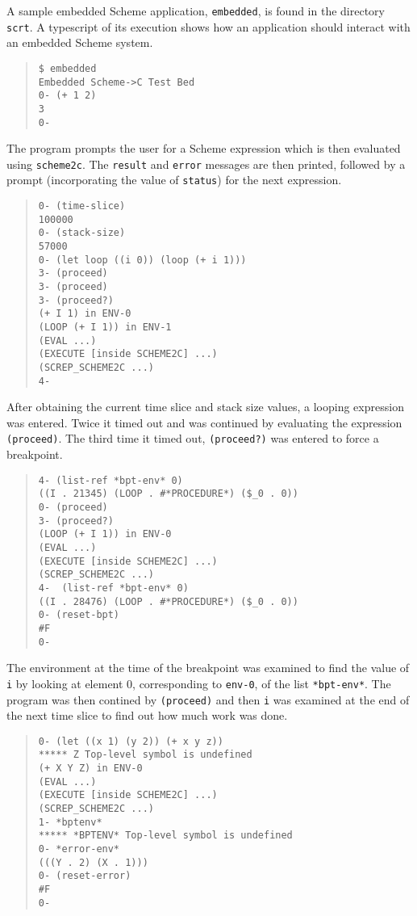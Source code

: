 \documentclass[12pt]{article}
\begin{document}
A sample embedded Scheme application, \texttt{embedded}, is found in
the directory \texttt{scrt}.  A typescript of its execution shows
how an application should interact with an embedded Scheme system.
\begin{quote}
\begin{verbatim}
$ embedded
Embedded Scheme->C Test Bed
0- (+ 1 2)
3
0-
\end{verbatim}
\end{quote}
The program prompts the user for a Scheme expression which is then
evaluated using \texttt{scheme2c}.  The \texttt{result} and
\texttt{error} messages are then printed, followed by a prompt
(incorporating the value of \texttt{status}) for the next expression.
\begin{quote}
\begin{verbatim}
0- (time-slice)
100000
0- (stack-size)
57000
0- (let loop ((i 0)) (loop (+ i 1)))
3- (proceed)
3- (proceed)
3- (proceed?)
(+ I 1) in ENV-0
(LOOP (+ I 1)) in ENV-1
(EVAL ...)
(EXECUTE [inside SCHEME2C] ...)
(SCREP_SCHEME2C ...)
4-
\end{verbatim}
\end{quote}
After obtaining the current time slice and stack size values, a
looping expression was entered.  Twice it timed out and was continued
by evaluating the expression \texttt{(proceed)}.  The third time it
timed out, \texttt{(proceed?)} was entered to force a breakpoint.
\begin{quote}
\begin{verbatim}
4- (list-ref *bpt-env* 0)
((I . 21345) (LOOP . #*PROCEDURE*) ($_0 . 0))
0- (proceed)
3- (proceed?)
(LOOP (+ I 1)) in ENV-0
(EVAL ...)
(EXECUTE [inside SCHEME2C] ...)
(SCREP_SCHEME2C ...)
4-  (list-ref *bpt-env* 0)
((I . 28476) (LOOP . #*PROCEDURE*) ($_0 . 0))
0- (reset-bpt)
#F
0-
\end{verbatim}
\end{quote}
The environment at the time of the breakpoint was examined to find the
value of \texttt{i} by looking at element 0, corresponding to
\texttt{env-0}, of the list \texttt{*bpt-env*}.  The program was then
contined by \texttt{(proceed)} and then \texttt{i} was examined at the
end of the next time slice to find out how much work was done.
\begin{quote}
\begin{verbatim}
0- (let ((x 1) (y 2)) (+ x y z))
***** Z Top-level symbol is undefined
(+ X Y Z) in ENV-0
(EVAL ...)
(EXECUTE [inside SCHEME2C] ...)
(SCREP_SCHEME2C ...)
1- *bptenv*
***** *BPTENV* Top-level symbol is undefined
0- *error-env*
(((Y . 2) (X . 1)))
0- (reset-error)
#F
0-
\end{verbatim}
\end{quote}
\end{document}
